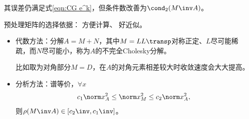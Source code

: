 \begin{corollary}
    其误差仍满足式\eqref{eqn:CG e^k}，但条件数改善为$\cond_2(M\inv A)$。
\end{corollary}

\begin{remark}
    预处理矩阵的选择依据：
    方便计算、
    好近似。
    \begin{itemize}
        \item 代数方法：分解$A=M+N$，其中$M=LL\transp$对称正定、$L$尽可能稀疏，而$N$尽可能小，称为$A$的不完全Cholesky分解。
        
        比如取为对角部分$M=D$，在$A$的对角元素相差较大时收敛速度会大大提高。
        \item 分析方法：谱等价，$\forall x$
        \[
            c_1\norm x_A^2\leq\norm x_M^2\leq c_2\norm x_A^2,
        \]
        则$\rho(M\inv A)\in[c_2\inv,c_1\inv]$。
    \end{itemize}
\end{remark}
